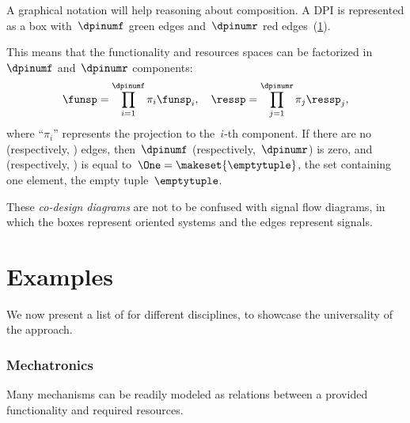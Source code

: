 A graphical notation will help reasoning about composition.
A DPI is represented as a box with~$\dpinumf$ green edges and~$\dpinumr$ red edges~(\cref{fig:dp_graphical}).

\begin{figure}[h]
    \centering
    \caption{\label{fig:dp_graphical}}
\end{figure}


This means that the functionality and resources spaces can be factorized in~$\dpinumf$ and~$\dpinumr$ components:
\begin{equation}
    \funsp=\prod_{i=1}^{\dpinumf}\pi_{i}\funsp_{i},\quad \ressp=\prod_{j=1}^{\dpinumr}\pi_{j}\ressp_{j},
\end{equation}
where ``$\pi_{i}$'' represents the projection to the~$i$-th component.
If there are no  (respectively, ) edges, then~$\dpinumf$ (respectively,~$\dpinumr$) is zero, and \funsp (respectively, \ressp) is equal to~$\One=\makeset{\emptytuple }$, the set containing one element, the empty tuple~$\emptytuple$.

These \emph{co-design diagrams} are not to be confused with signal flow diagrams, in which the boxes represent oriented systems and the edges represent signals.



\section{Examples}
We now present a list of  for different disciplines, to showcase the universality of the approach.

\subsubsection{Mechatronics}
Many mechanisms can be readily modeled as relations between a provided functionality and required resources.


